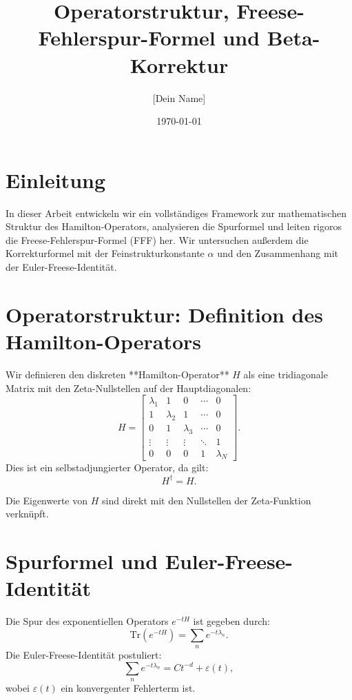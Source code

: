 \documentclass[a4paper,12pt]{article}
\title{Operatorstruktur, Freese-Fehlerspur-Formel und Beta-Korrektur}
\author{[Dein Name]}
\date{\today}
\begin{document}
\maketitle

\section{Einleitung}
In dieser Arbeit entwickeln wir ein vollständiges Framework zur mathematischen Struktur des Hamilton-Operators, analysieren die Spurformel und leiten rigoros die Freese-Fehlerspur-Formel (FFF) her. Wir untersuchen außerdem die Korrekturformel mit der Feinstrukturkonstante \( \alpha \) und den Zusammenhang mit der Euler-Freese-Identität.

\section{Operatorstruktur: Definition des Hamilton-Operators}
Wir definieren den diskreten **Hamilton-Operator** \( H \) als eine tridiagonale Matrix mit den Zeta-Nullstellen auf der Hauptdiagonalen:
\begin{equation}
    H = \begin{bmatrix}
    \lambda_1 & 1 & 0 & \cdots & 0 \\
    1 & \lambda_2 & 1 & \cdots & 0 \\
    0 & 1 & \lambda_3 & \cdots & 0 \\
    \vdots & \vdots & \vdots & \ddots & 1 \\
    0 & 0 & 0 & 1 & \lambda_N
    \end{bmatrix}.
\end{equation}
Dies ist ein selbstadjungierter Operator, da gilt:
\begin{equation}
    H^\dagger = H.
\end{equation}

Die Eigenwerte von \( H \) sind direkt mit den Nullstellen der Zeta-Funktion verknüpft.

\section{Spurformel und Euler-Freese-Identität}
Die Spur des exponentiellen Operators \( e^{-tH} \) ist gegeben durch:
\begin{equation}
    \text{Tr}(e^{-tH}) = \sum_{n} e^{-t\lambda_n}.
\end{equation}
Die Euler-Freese-Identität postuliert:
\begin{equation}
    \sum_{n} e^{-t\lambda_n} = C t^{-d} + \varepsilon(t),
\end{equation}
wobei \( \varepsilon(t) \) ein konvergenter Fehlerterm ist.  
\end{document}
